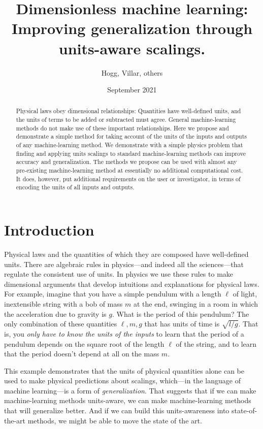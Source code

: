 \documentclass[12pt, letterpaper]{article}
\title{\bfseries
Dimensionless machine learning:\\
Improving generalization through units-aware scalings.}
\author{Hogg, Villar, others}
\date{September 2021}
\begin{document}
\maketitle\thispagestyle{empty}

\begin{abstract}\noindent
    Physical laws obey dimensional relationships:
    Quantities have well-defined units, and the units of terms to be added or subtracted must agree.
    General machine-learning methods do not make use of these important relationships.
    Here we propose and demonstrate a simple method for taking account of the units of the inputs and outputs of any machine-learning method.
    We demonstrate with a simple physics problem that finding and applying units scalings to standard machine-learning methods can improve accuracy and generalization.
    The methods we propose can be used with almost any pre-existing machine-learning method at essentially no additional computational cost.
    It does, however, put additional requirements on the user or investigator, in terms of encoding the units of all inputs and outputs.
\end{abstract}

\section{Introduction}

Physical laws and the quantities of which they are composed have well-defined units.
There are algebraic rules in physics---and indeed all the sciences---that regulate the consistent use of units.
In physics we use these rules to make dimensional arguments that develop intuitions and explanations for physical laws.
For example, imagine that you have a simple pendulum with a length $\ell$ of light, inextensible string with a bob of mass $m$ at the end, swinging in a room in which the acceleration due to gravity is $g$. What is the period of this pendulum? The only combination of these quantities $\ell, m, g$ that has units of time is $\sqrt{l/g}$. That is, you \emph{only have to know the units of the inputs} to learn that the period of a pendulum depends on the square root of the length $\ell$ of the string, and to learn that the period doesn't depend at all on the mass $m$.

This example demonstrates that the units of physical quantities alone can be used to make physical predictions about scalings, which---in the language of machine learning---is a form of \emph{generalization}.
That suggests that if we can make machine-learning methods units-aware, we can make machine-learning methods that will generalize better.
And if we can build this units-awareness into state-of-the-art methods, we might be able to move the state of the art.
\end{document}
